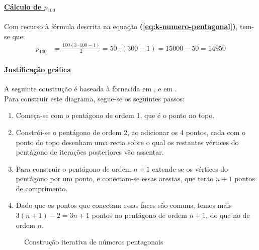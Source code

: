 \paragraph{\underline{Cálculo de $p_{100}$}}\hfill

\vspace{0.25cm}

\noindent
Com recurso à fórmula descrita na equação
\textbf{(\ref{eq:k-numero-pentagonal})}, tem-se que:
\begin{align*}
	p_{100}
	&= \frac{100(3 \cdot 100 - 1)}{2} = 50 \cdot (300 - 1)
	= 15000 - 50 = 14950
\end{align*}

\clearpage

\paragraph{\underline{Justificação gráfica}}\hfill

\vspace{0.25cm}

A seguinte construção é baseada à fornecida
em \cite[problema 16.]{HMAF1},
e em \cite[pág. 33]{Kline1990Vol1}.\\
Para construir este diagrama, segue-se os seguintes passos:
\begin{enumerate}
	\item Começa-se com o pentágono de ordem 1, que é o ponto no topo.
	\item Constrói-se o pentágono de ordem 2, ao adicionar os 4 pontos, cada com o ponto do topo
		desenham uma recta sobre
		o qual os restantes vértices do pentágono de iterações posteriores vão assentar.
	\item Para construir o pentágono de ordem $n+1$ extende-se os vértices do pentágono por um
		ponto, e conectam-se essas arestas, que terão $n+1$ pontos de comprimento.
	\item Dado que os pontos que conectam essas faces são comuns, temos mais $3(n + 1) - 2 = 3n + 1$
		pontos no pentágono de ordem $n+1$, do que no de ordem $n$.
\end{enumerate}

\begin{figure}[h]
	\centering
	
	\caption{Construção iterativa de números pentagonais}
\end{figure}




